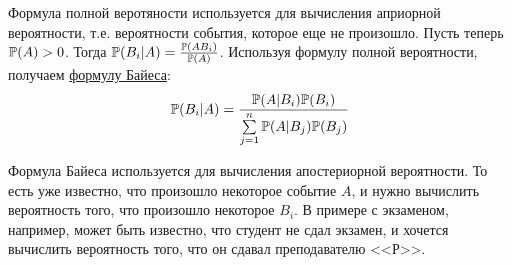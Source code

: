 \documentclass[../TV&MS.tex]{subfiles}
\begin{document}
Формула полной веротяности используется для вычисления априорной вероятности, т.е. вероятности события, которое  еще не произошло.
Пусть теперь \\$\mathbb{P}(A) > 0$. Тогда $\mathbb{P}(B_i|A)=\frac{\mathbb{P}(AB_i)}{\mathbb{P}(A)}$. Используя формулу полной вероятности, получаем \underline{формулу Байеса}:
$$\mathbb{P}(B_i|A)=\frac{\mathbb{P}(A|B_i)\mathbb{P}(B_i)}{\sum\limits_{j=1}^n\mathbb{P}(A|B_j)\mathbb{P}(B_j)}$$

Формула Байеса используется для вычисления апостериорной вероятности. То есть уже известно, что произошло некоторое событие $A$, и нужно вычислить вероятность
того, что произошло некоторое $B_i$. В примере с экзаменом, например, может быть известно, что студент не сдал экзамен, и хочется вычислить вероятность того, что он
сдавал преподавателю <<Р>>.

\newpage
\end{document}

